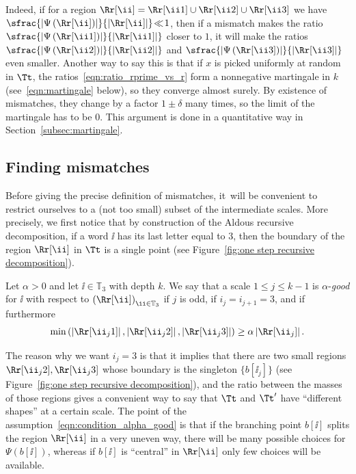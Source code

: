 Indeed, if for a region $\Rr[\ii]=\Rr[\ii 1] \cup \Rr[\ii 2] \cup \Rr[\ii 3]$ we have \hbox{$\sfrac{\left|\Psi \left( \Rr[\ii] \right)\right|}{\left|\Rr[\ii] \right|}\!\ll\! 1$}, then if a mismatch makes the ratio $\sfrac{\left|\Psi \left( \Rr[\ii 1] \right)\right|}{\left|\Rr[\ii 1] \right|}$ closer to $1$, it will make the ratios $\sfrac{\left|\Psi \left( \Rr[\ii 2] \right)\right|}{\left|\Rr[\ii 2] \right|}$ and $\sfrac{\left|\Psi \left( \Rr[\ii 3] \right)\right|}{\left|\Rr[\ii 3] \right|}$ even smaller. Another way to say this is that if $x$ is picked uniformly at random in $\Tt$, the ratios~\eqref{eqn:ratio_rprime_vs_r} form a nonnegative martingale in $k$ (see~\eqref{eqn:martingale} below), so they converge almost surely. By existence of mismatches, they change by a factor $1\pm\delta$ many times, so the limit of the martingale has to be $0$. This argument is done in a quantitative way in Section~\ref{subsec:martingale}.

\subsection{Finding mismatches}\label{subsec:mismatches}

Before giving the precise definition of mismatches, it~will be convenient to restrict ourselves to a (not too small) subset of the intermediate scales. More precisely, we first notice that by construction of the Aldous recursive decomposition, if a word $\ii$ has its last letter equal to $3$, then the boundary of the region $\Rr[\ii]$ in $\Tt$ is a single point (see Figure~\ref{fig:one step recursive decomposition}).
\begin{definition}\label{defn:good_scale}
Let $\alpha>0$ and let $\ii \in \mathbb{T}_3$ with depth $k$.
We say that a scale $1 \leq j \leq k-1$ is $\alpha$-\emph{good} for $\ii$ with respect to $\left( \Rr[\ii]\right)_{\ii \in \mathbb{T}_3}$ if $j$ is odd, if $i_j=i_{j+1}=3$, and if furthermore
\begin{equation}\label{eqn:condition_alpha_good}
\min \left( \left| \Rr[\ii_j 1] \right|, \left| \Rr[\ii_j 2] \right|, \left| \Rr[\ii_j 3] \right| \right) \geq \alpha \left| \Rr[\ii_j] \right|.
\end{equation}
\end{definition}
The reason why we want $i_j=3$ is that it implies that there are two small regions $\Rr[\ii_j 2], \Rr[\ii_j 3]$ whose boundary is the singleton $\{ b[\ii_j] \}$ (see Figure~\ref{fig:one step recursive decomposition}), and the ratio between the masses of those regions gives a convenient way to say that $\Tt$ and $\Tt'$ have ``different shapes'' at a certain scale.
The point of the assumption~\eqref{eqn:condition_alpha_good} is that if the branching point $b[\ii]$ splits the region $\Rr[\ii]$ in a very uneven way, there will be many possible choices for $\Psi(b[\ii])$, whereas if $b[\ii]$ is ``central'' in $\Rr[\ii]$ only few choices will be available.

